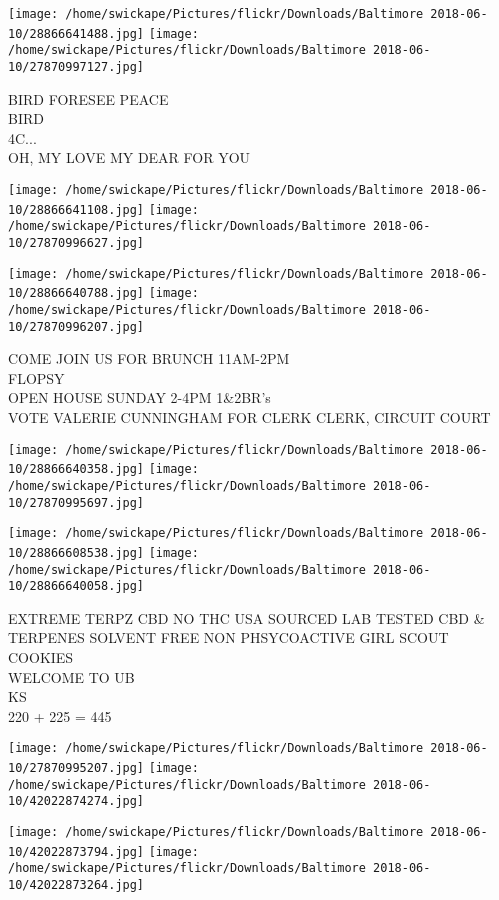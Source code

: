 \documentclass[10pt,letterpaper]{article}
\begin{document}
\texttt{[image: /home/swickape/Pictures/flickr/Downloads/Baltimore 2018-06-10/28866641488.jpg]}
\texttt{[image: /home/swickape/Pictures/flickr/Downloads/Baltimore 2018-06-10/27870997127.jpg]}

BIRD FORESEE PEACE\\
BIRD\\
4C...\\
OH, MY LOVE MY DEAR FOR YOU\\
\pagebreak

\texttt{[image: /home/swickape/Pictures/flickr/Downloads/Baltimore 2018-06-10/28866641108.jpg]}
\texttt{[image: /home/swickape/Pictures/flickr/Downloads/Baltimore 2018-06-10/27870996627.jpg]}

\texttt{[image: /home/swickape/Pictures/flickr/Downloads/Baltimore 2018-06-10/28866640788.jpg]}
\texttt{[image: /home/swickape/Pictures/flickr/Downloads/Baltimore 2018-06-10/27870996207.jpg]}

COME JOIN US FOR BRUNCH 11AM{-}2PM\\
FLOPSY\\
OPEN HOUSE SUNDAY 2{-}4PM 1\&2BR's\\
VOTE VALERIE CUNNINGHAM FOR CLERK CLERK, CIRCUIT COURT\\
\pagebreak

\texttt{[image: /home/swickape/Pictures/flickr/Downloads/Baltimore 2018-06-10/28866640358.jpg]}
\texttt{[image: /home/swickape/Pictures/flickr/Downloads/Baltimore 2018-06-10/27870995697.jpg]}

\texttt{[image: /home/swickape/Pictures/flickr/Downloads/Baltimore 2018-06-10/28866608538.jpg]}
\texttt{[image: /home/swickape/Pictures/flickr/Downloads/Baltimore 2018-06-10/28866640058.jpg]}

EXTREME TERPZ CBD NO THC USA SOURCED LAB TESTED CBD \& TERPENES SOLVENT FREE NON PHSYCOACTIVE GIRL SCOUT COOKIES\\
WELCOME TO UB\\
KS\\
220 + 225 = 445\\
\pagebreak

\texttt{[image: /home/swickape/Pictures/flickr/Downloads/Baltimore 2018-06-10/27870995207.jpg]}
\texttt{[image: /home/swickape/Pictures/flickr/Downloads/Baltimore 2018-06-10/42022874274.jpg]}

\texttt{[image: /home/swickape/Pictures/flickr/Downloads/Baltimore 2018-06-10/42022873794.jpg]}
\texttt{[image: /home/swickape/Pictures/flickr/Downloads/Baltimore 2018-06-10/42022873264.jpg]}
\end{document}
